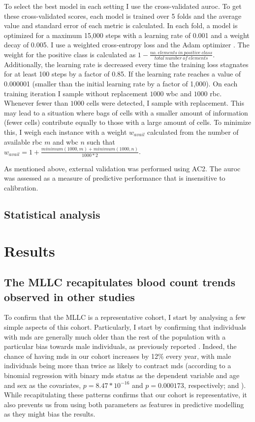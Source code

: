 To select the best model in each setting I use the cross-validated \ac{auroc}. To get these cross-validated scores, each model is trained over 5 folds and the average value and standard error of each metric is calculated. In each fold, a model is optimized for a maximum 15,000 steps with a learning rate of 0.001 and a weight decay of 0.005. I use a weighted cross-entropy loss and the Adam optimizer \cite{Kingma2014-zd}. The weight for the positive class is calculated as $1 - \frac{no.\ elements\ in\ positive\ class}{total\ number\ of\ elements}$. Additionally, the learning rate is decreased every time the training loss stagnates for at least 100 steps by a factor of 0.85. If the learning rate reaches a value of 0.000001 (smaller than the initial learning rate by a factor of 1,000). On each training iteration I sample without replacement $1000$ \ac{wbc} and $1000$ \ac{rbc}. Whenever fewer than $1000$ cells were detected, I sample with replacement. This may lead to a situation where bags of cells with a smaller amount of information (fewer cells) contribute equally to those with a large amount of cells. To minimize this, I weigh each instance with a weight $w_{avail}$ calculated from the number of available \ac{rbc} $m$ and \ac{wbc} $n$ such that $w_{avail} = 1 + \frac{minimum(1000,m) + minimum(1000,n)}{1000*2}$.

As mentioned above, external validation was performed using AC2. The \ac{auroc} was assessed as a measure of predictive performance that is insensitive to calibration. 

\subsection{Statistical analysis}

\section{Results}

\subsection{The MLLC recapitulates blood count trends observed in other studies}

To confirm that the MLLC is a representative cohort, I start by analysing a few simple aspects of this cohort. Particularly, I start by confirming that individuals with \ac{mds} are generally much older than the rest of the population with a particular bias towards male individuals, as previously reported \cite{Rollison2008-yg}. Indeed, the chance of having \ac{mds} in our cohort increases by 12\% every year, with male individuals being more than twice as likely to contract \ac{mds} (according to a binomial regression with binary \ac{mds} status as the dependent variable and age and sex as the covariates, $p=8.47*10^{-16}$ and $p=0.000173$, respectively;  and ). While recapitulating these patterns confirms that our cohort is representative, it also prevents us from using both parameters as features in predictive modelling as they might bias the results.

